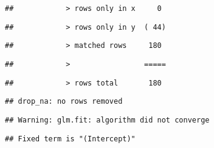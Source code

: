 \documentclass[
]{article}
\begin{document}
\begin{verbatim}
##            > rows only in x     0
\end{verbatim}

\begin{verbatim}
##            > rows only in y  ( 44)
\end{verbatim}

\begin{verbatim}
##            > matched rows     180
\end{verbatim}

\begin{verbatim}
##            >                 =====
\end{verbatim}

\begin{verbatim}
##            > rows total       180
\end{verbatim}

\begin{verbatim}
## drop_na: no rows removed
\end{verbatim}

\begin{verbatim}
## Warning: glm.fit: algorithm did not converge
\end{verbatim}

\begin{verbatim}
## Fixed term is "(Intercept)"
\end{verbatim}
\end{document}
